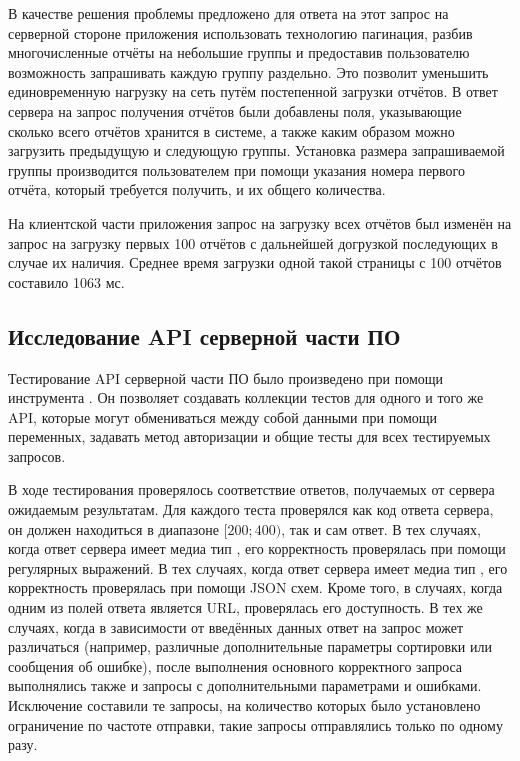 \tab
В качестве решения проблемы предложено для ответа на этот запрос на серверной стороне приложения использовать технологию пагинация, разбив многочисленные отчёты на небольшие группы и предоставив пользователю возможность запрашивать каждую группу раздельно.
Это позволит уменьшить единовременную нагрузку на сеть путём постепенной загрузки отчётов.
В ответ сервера на запрос получения отчётов были добавлены поля, указывающие сколько всего отчётов хранится в системе, а также каким образом можно загрузить предыдущую и следующую группы.
Установка размера запрашиваемой группы производится пользователем при помощи указания номера первого отчёта, который требуется получить, и их общего количества.

\tab
На клиентской части приложения запрос на загрузку всех отчётов был изменён на запрос на загрузку первых 100 отчётов с дальнейшей догрузкой последующих в случае их наличия.
Среднее время загрузки одной такой страницы с 100 отчётов составило 1063 мс.

\subsection{Исследование API серверной части ПО}

\tab
Тестирование API серверной части ПО было произведено при помощи инструмента \cite{postman}.
Он позволяет создавать коллекции тестов для одного и того же API, которые могут обмениваться между собой данными при помощи переменных, задавать метод авторизации и общие тесты для всех тестируемых запросов.

\tab
В ходе тестирования проверялось соответствие ответов, получаемых от сервера ожидаемым результатам. Для каждого теста проверялся как код ответа сервера, он должен находиться в диапазоне $[200; 400)$, так и сам ответ.
В тех случаях, когда ответ сервера имеет медиа тип , его корректность проверялась при помощи регулярных выражений. В тех случаях, когда ответ сервера имеет медиа тип , его корректность проверялась при помощи JSON схем.
Кроме того, в случаях, когда одним из полей ответа является URL, проверялась его доступность.
В тех же случаях, когда в зависимости от введённых данных ответ на запрос может различаться (например, различные дополнительные параметры сортировки или сообщения об ошибке), после выполнения основного корректного запроса выполнялись также и запросы с дополнительными параметрами и ошибками.
Исключение составили те запросы, на количество которых было установлено ограничение по частоте отправки, такие запросы отправлялись только по одному разу.

